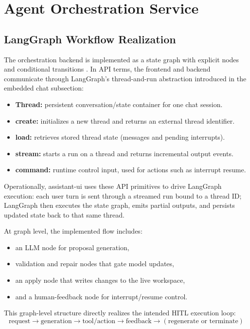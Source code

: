 \section{Agent Orchestration Service}
\subsection{LangGraph Workflow Realization}
The orchestration backend is implemented as a state graph with explicit nodes and conditional transitions \cite{langchainLangGraph}. In API terms, the frontend and backend communicate through LangGraph's thread-and-run abstraction introduced in the embedded chat subsection:
\begin{itemize}
    \item \textbf{Thread:} persistent conversation/state container for one chat session.
    \item \textbf{create:} initializes a new thread and returns an external thread identifier.
    \item \textbf{load:} retrieves stored thread state (messages and pending interrupts).
    \item \textbf{stream:} starts a run on a thread and returns incremental output events.
    \item \textbf{command:} runtime control input, used for actions such as interrupt resume.
\end{itemize}

Operationally, assistant-ui uses these API primitives to drive LangGraph execution: each user turn is sent through a streamed run bound to a thread ID; LangGraph then executes the state graph, emits partial outputs, and persists updated state back to that same thread.

At graph level, the implemented flow includes:
\begin{itemize}
    \item an LLM node for proposal generation,
    \item validation and repair nodes that gate model updates,
    \item an apply node that writes changes to the live workspace,
    \item and a human-feedback node for interrupt/resume control.
\end{itemize}

This graph-level structure directly realizes the intended HITL execution loop:
\[
\text{request} \rightarrow \text{generation} \rightarrow \text{tool/action} \rightarrow \text{feedback} \rightarrow (\text{regenerate or terminate})
\]

